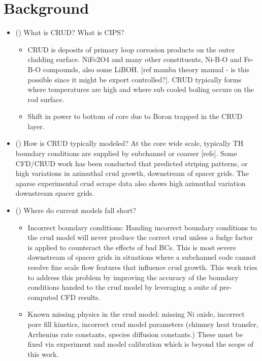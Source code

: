 \section{Background}

\begin{itemize}
	\item (\checkmark) What is CRUD?  What is CIPS? 
		\begin{itemize}
		\item CRUD is deposits of primary loop corrosion products on the outer cladding surface.  NiFe2O4 and many other constituents, Ni-B-O and Fe-B-O compounds, also some LiBOH. [ref mamba theory manual - is this possible since it might be export controlled?].  CRUD  typically forms where temperatures are high and where sub cooled boiling occurs on the rod surface.
		\item Shift in power to bottom of core due to Boron trapped in the CRUD layer.
		\end{itemize}
	\item (\checkmark) How is CRUD typically modeled?  At the core wide scale, typically TH boundary conditions are supplied by subchannel or coarser [refs].  Some CFD/CRUD work has been conducted that predicted striping patterns, or high variations in azimuthal crud growth, downstream of spacer grids.  The aparse experimental crud scrape data also shows high azimuthal variation downstream spacer grids.
	\item (\checkmark) Where do current models fall short?  
	\begin{itemize}
		\item Incorrect boundary conditions: Handing incorrect boundary conditions to the crud model will never produce the correct crud unless a fudge factor is applied to counteract the effects of bad BCs.  This is most severe downstream of spacer grids in situations where a subchannel code cannot resolve fine scale flow features that influence crud growth.  This work tries to address this problem by improving the accuracy of the boundary conditions handed to the crud model by leveraging a suite of pre-computed CFD results.
		\item Known missing physics in the crud model: missing Ni oxide, incorrect pore fill kinetics, incorrect crud model parameters (chimney heat transfer, Arrhenius rate constants, species diffusion constants.) These must be fixed via experiment and model calibration which is beyond the scope of this work.
	\end{itemize}
\end{itemize}

